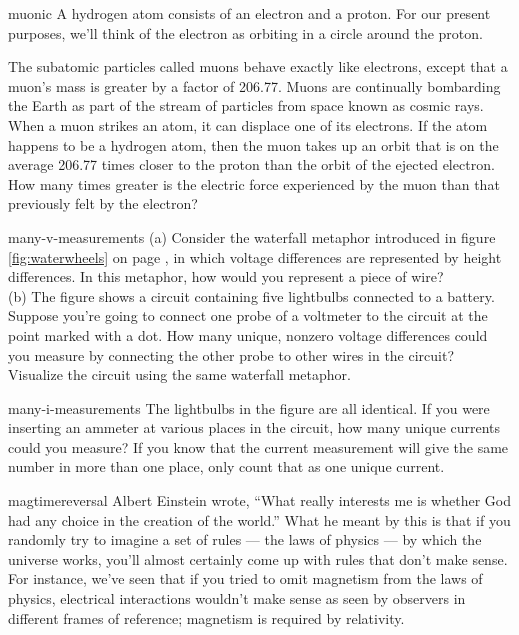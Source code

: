 \begin{hwsection}

\begin{hw}{muonic}
	A hydrogen atom consists of an electron and a proton. For our
	present purposes, we'll think of the electron as orbiting in
	a circle around the proton.
	
	The subatomic particles called muons behave exactly like
	electrons, except that a muon's mass is greater by a factor
	of 206.77.  Muons are continually bombarding the Earth as
	part of the stream of particles from space known as cosmic
	rays.  When a muon strikes an atom, it can displace one of
	its electrons.  If the atom happens to be a hydrogen atom,
	then the muon takes up an orbit that is on the average
	206.77 times closer to the proton than the orbit of the
	ejected electron.  How many times greater is the electric
	force experienced by the muon than that previously
	felt by the electron?
\end{hw}


\begin{hw}{many-v-measurements}
(a) Consider the waterfall metaphor introduced in figure \ref{fig:waterwheels}
on page \pageref{fig:waterwheels}, in which voltage differences are represented by
height differences. In this metaphor, how would you represent a piece of wire?\\
(b) The figure shows a circuit containing five lightbulbs connected to a battery.
Suppose you're going to connect one probe of a voltmeter to the circuit at
the point marked with a dot. How many unique, nonzero voltage differences
could you measure by connecting the other probe to other wires in the circuit?
Visualize the circuit using the same waterfall metaphor.
\end{hw}


\begin{hw}{many-i-measurements}
The lightbulbs in the figure are all identical. If you were inserting an ammeter
at various places in the circuit, how many unique currents could you measure?
If you know that the current measurement will give the same number in more than
one place, only count that as one unique current.
\end{hw}

\begin{hw}{magtimereversal}
Albert Einstein wrote, ``What really interests me is whether God had any
choice in the creation of the world.'' What he meant by this is that if you randomly
try to imagine a set of rules --- the laws of physics --- by which the universe
works, you'll almost certainly come up with rules that don't make sense. For instance,
we've seen that if you tried to omit magnetism from the laws of physics, electrical
interactions wouldn't make sense as seen by observers in different frames of reference;
magnetism is required by relativity.


\end{hw}
\end{hwsection}
